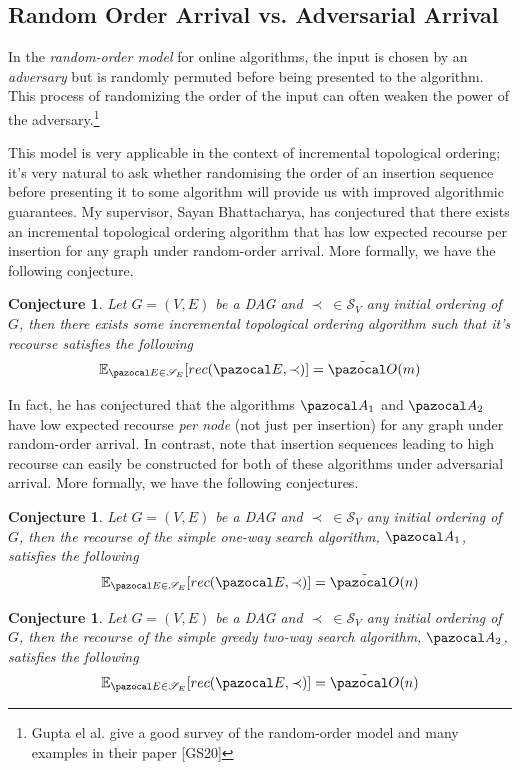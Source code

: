 \documentclass{report}
\newtheorem{conjecture}[theorem]{Conjecture}
\begin{document}
\subsection{Random Order Arrival vs. Adversarial Arrival}

In the \textit{random-order model} for online algorithms, the input is chosen by an \textit{adversary} but is randomly permuted before being presented to the algorithm. This process of randomizing the order of the input can often weaken the power of the adversary.\footnote{Gupta el al. give a good survey of the random-order model and many examples in their paper [GS20]}

This model is very applicable in the context of incremental topological ordering; it's very natural to ask whether randomising the order of an insertion sequence before presenting it to some algorithm will provide us with improved algorithmic guarantees. My supervisor, Sayan Bhattacharya, has conjectured that there exists an incremental topological ordering algorithm that has low expected recourse per insertion for any graph under random-order arrival. More formally, we have the following conjecture.

\begin{conjecture}\label{mainconjecture}
Let $G=(V,E)$ be a DAG and $\prec \: \in \mathcal S_V$ any initial ordering of $G$, then there exists some incremental topological ordering algorithm such that it's recourse satisfies the following
\[ \mathbb E_{\pazocal E \in \mathcal S_E}[rec(\pazocal E, \prec)] = \tilde{\pazocal O}(m) \]
\end{conjecture}

In fact, he has conjectured that the algorithms $\pazocal A_1$ and $\pazocal A_2$ have low expected recourse \textit{per node} (not just per insertion) for any graph under random-order arrival. In contrast, note that insertion sequences leading to high recourse can easily be constructed for both of these algorithms under adversarial arrival. More formally, we have the following conjectures.

\begin{conjecture}\label{A1conjecture}
Let $G=(V,E)$ be a DAG and $\prec \: \in \mathcal S_V$ any initial ordering of $G$, then the recourse of the simple one-way search algorithm, $\pazocal A_1$, satisfies the following
\[ \mathbb E_{\pazocal E \in \mathcal S_E}[rec(\pazocal E, \prec)] = \tilde{\pazocal O}(n) \]
\end{conjecture}

\begin{conjecture}\label{A2conjecture}
Let $G=(V,E)$ be a DAG and $\prec \: \in \mathcal S_V$ any initial ordering of $G$, then the recourse of the simple greedy two-way search algorithm, $\pazocal A_2$, satisfies the following
\[ \mathbb E_{\pazocal E \in \mathcal S_E}[rec(\pazocal E, \prec)] = \tilde{\pazocal O}(n) \]
\end{conjecture}
\end{document}
